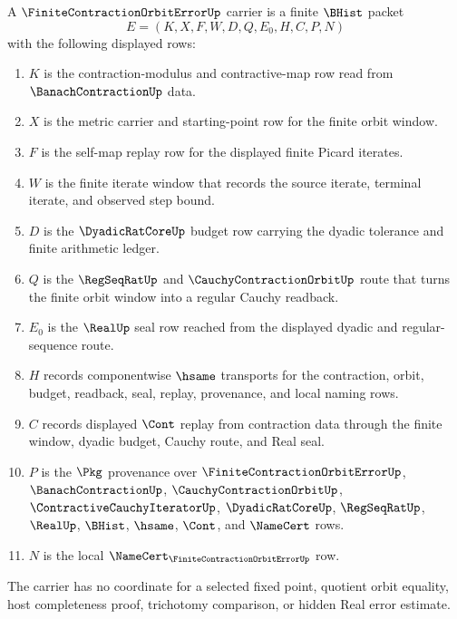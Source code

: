 \begin{definition}
\label{def:finite-contraction-orbit-error-carrier}
A $\FiniteContractionOrbitErrorUp$ carrier is a finite $\BHist$ packet
$$
E=(K,X,F,W,D,Q,E_0,H,C,P,N)
$$
with the following displayed rows:
\begin{enumerate}
\item $K$ is the contraction-modulus and contractive-map row read from $\BanachContractionUp$ data.
\item $X$ is the metric carrier and starting-point row for the finite orbit window.
\item $F$ is the self-map replay row for the displayed finite Picard iterates.
\item $W$ is the finite iterate window that records the source iterate, terminal iterate, and observed step bound.
\item $D$ is the $\DyadicRatCoreUp$ budget row carrying the dyadic tolerance and finite arithmetic ledger.
\item $Q$ is the $\RegSeqRatUp$ and $\CauchyContractionOrbitUp$ route that turns the finite orbit window into a regular Cauchy readback.
\item $E_0$ is the $\RealUp$ seal row reached from the displayed dyadic and regular-sequence route.
\item $H$ records componentwise $\hsame$ transports for the contraction, orbit, budget, readback, seal, replay, provenance, and local naming rows.
\item $C$ records displayed $\Cont$ replay from contraction data through the finite window, dyadic budget, Cauchy route, and Real seal.
\item $P$ is the $\Pkg$ provenance over $\FiniteContractionOrbitErrorUp$, $\BanachContractionUp$, $\CauchyContractionOrbitUp$, $\ContractiveCauchyIteratorUp$, $\DyadicRatCoreUp$, $\RegSeqRatUp$, $\RealUp$, $\BHist$, $\hsame$, $\Cont$, and $\NameCert$ rows.
\item $N$ is the local $\NameCert_{\FiniteContractionOrbitErrorUp}$ row.
\end{enumerate}
The carrier has no coordinate for a selected fixed point, quotient orbit equality, host completeness proof, trichotomy comparison, or hidden Real error estimate.
\end{definition}

